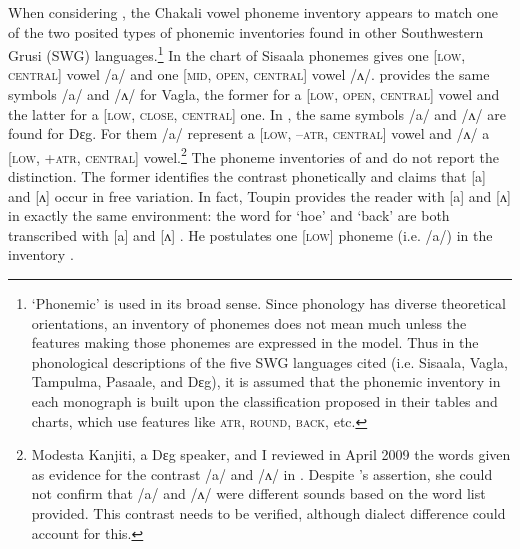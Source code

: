 When considering  \cite{Rowl65, Crou66, Gray69,   Toup95, Crou03}, the Chakali vowel phoneme 
inventory appears to match one of the two posited types of  phonemic inventories found in other  
Southwestern Grusi (SWG) languages.\footnote{`Phonemic' is used in its broad sense. Since phonology 
has diverse theoretical orientations,  an inventory of phonemes does not mean much unless the 
features making those phonemes are expressed in the model.  Thus in the phonological descriptions 
of the five SWG languages cited (i.e. Sisaala, Vagla, Tampulma,  Pasaale, and  Dɛg), it is assumed 
that the phonemic inventory in each monograph is built upon the classification proposed in their 
tables and charts, which use features like \textsc{atr}, \textsc{round}, \textsc{back}, etc.} In 
\citet[15]{Rowl65} the chart of Sisaala phonemes gives one [\textsc{low}, \textsc{central}] vowel 
/a/ and one [\textsc{mid}, \textsc{open}, \textsc{central}] vowel /ʌ/. \citet[17]{Crou66} provides 
the same symbols /a/ and /ʌ/ for Vagla, the former for a [\textsc{low}, \textsc{open}, 
\textsc{central}] vowel and the latter for a [\textsc{low}, \textsc{close}, \textsc{central}] one. 
In \citet[3]{Crou03}, the same symbols /a/ and /ʌ/ are found for Dɛg. For them /a/ represent a 
[\textsc{low}, \textsc{--atr}, \textsc{central}] vowel and /ʌ/ a [\textsc{low}, \textsc{+atr}, 
\textsc{central}] vowel.\footnote{\label{fn:info-deg}Modesta Kanjiti, a  Dɛg speaker,  and I 
reviewed  in April 2009 the words given as evidence for the contrast /a/ and /ʌ/ in 
\citet[20--21]{Crou03}. Despite  \citeauthor{Crou03}'s assertion,   she could not confirm that /a/ 
and /ʌ/ were different sounds based on the word list provided. This contrast needs to be verified, 
although dialect difference could account for this.}   The phoneme inventories of \citet[16]{Toup95} 
and  \citet[21]{Gray69} do not report the distinction. The former identifies the contrast 
phonetically and claims that [a] and [ʌ] occur in free variation. In fact, Toupin provides the 
reader with [a] and [ʌ] in exactly the same environment: the word for `hoe' and `back' are both 
transcribed with [a] and [ʌ]  \citep[26]{Toup95}. He postulates one [\textsc{low}] phoneme (i.e.  
/a/) in the inventory \citep[16]{Toup95}.

